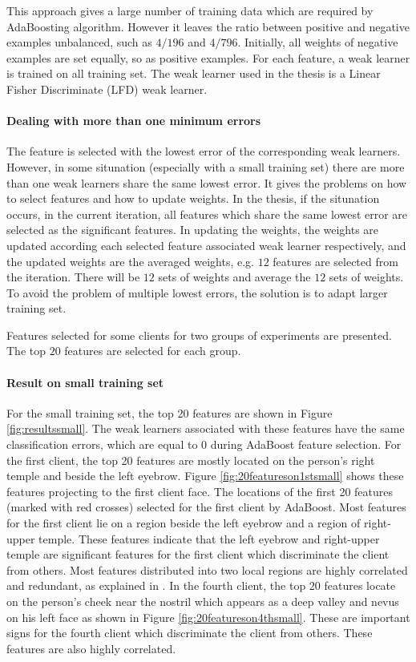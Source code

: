 This approach gives a large number of training data which are required by AdaBoosting algorithm. However it leaves the ratio between positive and negative examples unbalanced, such as $4/196$ and $4/796$. Initially, all weights of negative examples are set equally, so as positive examples. For each feature, a weak learner is trained on all training set. The weak learner used in the thesis is a Linear Fisher Discriminate (LFD) weak learner. 

\paragraph{Dealing with more than one minimum errors}The feature is selected with the lowest error of the corresponding weak learners. However, in some situnation (especially with a small training set) there are more than one weak learners share the same lowest error. It gives the problems on how to select features and how to update weights. In the thesis, if the situnation occurs, in the current iteration, all features which share the same lowest error are selected as the significant features. In updating the weights, the weights are updated according each selected feature associated weak learner respectively, and the updated weights are the averaged weights, e.g. $12$ features are selected from the iteration. There will be $12$ sets of weights and average the $12$ sets of weights. To avoid the problem of multiple lowest errors, the solution is to adapt larger training set.

Features selected for some clients for two groups of experiments are presented. The top $20$ features are selected for each group.
\paragraph{Result on small training set}For the small training set, the top 20 features are shown in \mbox{Figure} \ref{fig:resultssmall}. The weak learners associated with these features have the same classification errors, which are equal to $0$ during AdaBoost feature selection. For the first client, the top 20 features are mostly located on the person's right temple and beside the left eyebrow. \mbox{Figure} \ref{fig:20featureson1stsmall} shows these features projecting to the first client face. The locations of the first 20 features (marked with red crosses) selected for the first client by AdaBoost. Most features for the first client lie on a region beside the left eyebrow and a region of right-upper temple. These features indicate that the left eyebrow and right-upper temple are significant features for the first client which discriminate the client from others. Most features distributed into two local regions are highly correlated and redundant, as explained in \cite{Penev1996}. In the fourth client, the top $20$ features locate on the person's cheek near the nostril which appears as a deep valley and nevus on his left face as shown in \mbox{Figure} \ref{fig:20featureson4thsmall}. These are important signs for the fourth client which discriminate the client from others. These features are also highly correlated.

